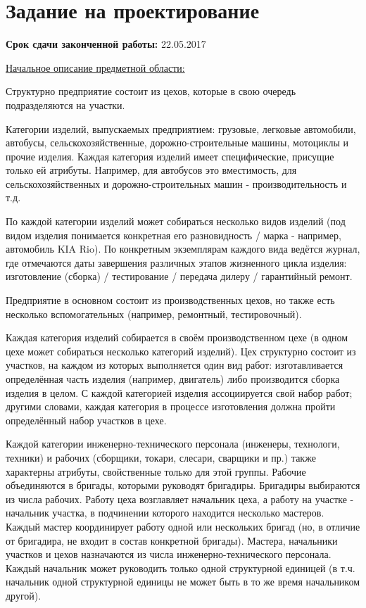 





\section*{Задание на проектирование}

{\bf Срок сдачи законченной работы: } 22.05.2017

\underline{Начальное описание предметной области:}

Структурно предприятие состоит из цехов, которые в свою очередь подразделяются на участки.

Категории изделий, выпускаемых предприятием: грузовые, легковые автомобили, автобусы, сельскохозяйственные, дорожно-строительные машины, мотоциклы и прочие изделия.
Каждая категория изделий имеет специфические, присущие только ей атрибуты.
Например, для автобусов это вместимость, для сельскохозяйственных и дорожно-строительных машин - производительность и т.д.

По каждой категории изделий может собираться несколько видов изделий (под видом изделия понимается конкретная его разновидность / марка - например, автомобиль KIA Rio).
По конкретным экземплярам каждого вида ведётся журнал, где отмечаются даты завершения различных этапов жизненного цикла изделия: изготовление (сборка) / тестирование / передача дилеру / гарантийный ремонт.

Предприятие в основном состоит из производственных цехов, но также есть несколько вспомогательных (например, ремонтный, тестировочный).

Каждая категория изделий собирается в своём производственном цехе (в одном цехе может собираться несколько категорий изделий).
Цех структурно состоит из участков, на каждом из которых выполняется один вид работ: изготавливается определённая часть изделия (например, двигатель) либо производится сборка изделия в целом.
С каждой категорией изделия ассоциируется свой набор работ; другими словами, каждая категория в процессе изготовления должна пройти определённый набор участков в цехе.

Каждой категории инженерно-технического персонала (инженеры, технологи, техники) и рабочих (сборщики, токари, слесари, сварщики и пр.) также характерны атрибуты, свойственные только для этой группы.
Рабочие объединяются в бригады, которыми руководят бригадиры.
Бригадиры выбираются из числа рабочих.
Работу цеха возглавляет начальник цеха, а работу на участке - начальник участка, в подчинении которого находится несколько мастеров.
Каждый мастер координирует работу одной или нескольких бригад (но, в отличие от бригадира, не входит в состав конкретной бригады).
Мастера, начальники участков и цехов назначаются из числа инженерно-технического персонала.
Каждый начальник может руководить только одной структурной единицей (в т.ч. начальник одной структурной единицы не может быть в то же время начальником другой).

